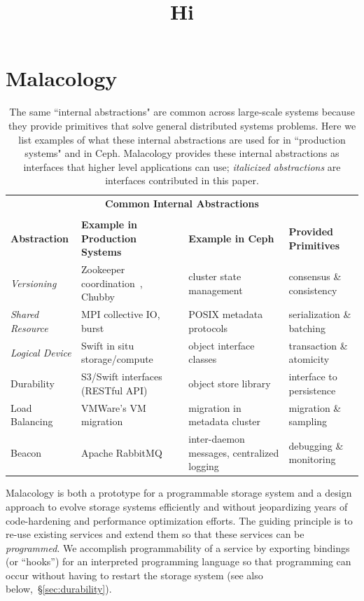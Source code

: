 \documentclass[preprint]{sigplanconf-eurosys}
\begin{document}
\section{Malacology}
\label{sec:malacology}

\begin{table}
\centering
\title{Hi}
\begin{tabular}{  l | l | l | l }
\multicolumn{4}{c}{\Large \textbf{Common Internal Abstractions}} \\
\multicolumn{4}{c}{} \\
\textbf{Abstraction}                    &
\textbf{Example in Production Systems}  &
\textbf{Example in Ceph}                &
\textbf{Provided Primitives}            \\ \hline
{\it Versioning}
  & Zookeeper coordination~\cite{hunt_zookeeper_2010}, Chubby~\cite{website:chubby}
  & cluster state management~\cite{website:ceph-mon}
  & consensus \& consistency
  \\
{\it Shared Resource}
  & MPI collective IO, burst
  & POSIX metadata protocols~\cite{CITEME}
  & serialization \& batching
  \\
{\it Logical Device}
  & Swift in situ storage/compute~\cite{website:zerocloud}
  & object interface classes~\cite{website:cls-lua}
  & transaction \& atomicity
  \\
Durability
  & S3/Swift interfaces (RESTful API)
  & object store library~\cite{weil_rados_2007}
  & interface to persistence
  \\
Load Balancing
  & VMWare's VM migration~\cite{vmware-drs,gulati:hotcloud2011-cloud-resource-management} 
  & migration in metadata cluster~\cite{weil:sc2004-dyn-metadata}
  & migration \& sampling
  \\
Beacon
  & Apache RabbitMQ~\cite{CITEME}
  & inter-daemon messages, centralized logging
  & debugging \& monitoring
  \\
\end{tabular}
\caption{The same ``internal abstractions" are common across large-scale
systems because they provide primitives that solve general distributed systems
problems.  Here we list examples of what these internal abstractions are used
for in ``production systems" and in Ceph.  Malacology provides these internal
abstractions as interfaces that higher level applications can use; {\it
italicized abstractions} are interfaces contributed in this paper.}
\label{table:examples}
\end{table}

Malacology is both a prototype for a programmable storage system and a design
approach to evolve storage systems efficiently and without jeopardizing years
of code-hardening and performance optimization efforts. The guiding principle
is to re-use existing services and extend them so that these services can be
\emph{programmed}. We accomplish programmability of a service by exporting
bindings (or ``hooks'') for an interpreted programming language so that
programming can occur without having to restart the storage system (see also
below,~\S\ref{sec:durability}). 
\end{document}
